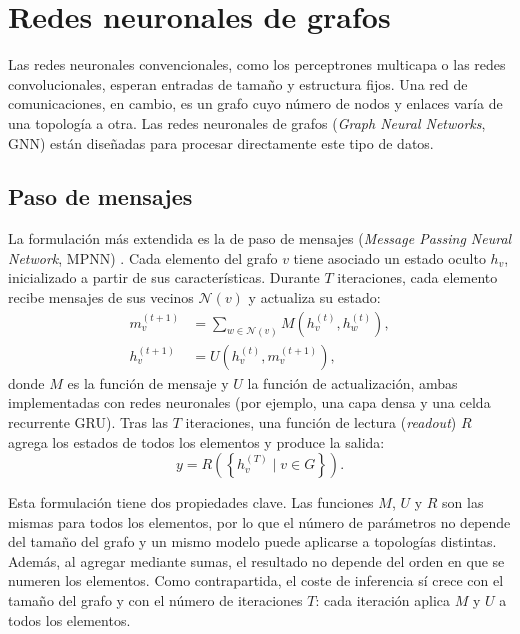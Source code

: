 \section{Redes neuronales de grafos}\label{sec:gnn}

Las redes neuronales convencionales, como los perceptrones multicapa o las redes convolucionales, esperan entradas de tamaño y estructura fijos. Una red de comunicaciones, en cambio, es un grafo cuyo número de nodos y enlaces varía de una topología a otra. Las redes neuronales de grafos (\textit{Graph Neural Networks}, GNN) \cite{scarselli2009graph} están diseñadas para procesar directamente este tipo de datos.

\subsection{Paso de mensajes}\label{sec:mpnn}

La formulación más extendida es la de paso de mensajes (\textit{Message Passing Neural Network}, MPNN) \cite{gilmer2017neural}. Cada elemento del grafo $v$ tiene asociado un estado oculto $h_v$, inicializado a partir de sus características. Durante $T$ iteraciones, cada elemento recibe mensajes de sus vecinos $\mathcal{N}(v)$ y actualiza su estado:
\begin{align}
	m_v^{(t+1)} &= \sum_{w \in \mathcal{N}(v)} M\left(h_v^{(t)}, h_w^{(t)}\right), \label{eq:mp_msg}\\
	h_v^{(t+1)} &= U\left(h_v^{(t)}, m_v^{(t+1)}\right), \label{eq:mp_upd}
\end{align}
donde $M$ es la función de mensaje y $U$ la función de actualización, ambas implementadas con redes neuronales (por ejemplo, una capa densa y una celda recurrente GRU). Tras las $T$ iteraciones, una función de lectura (\textit{readout}) $R$ agrega los estados de todos los elementos y produce la salida:
\begin{equation}\label{eq:readout}
	y = R\left(\left\{ h_v^{(T)} \mid v \in G \right\}\right).
\end{equation}

Esta formulación tiene dos propiedades clave. Las funciones $M$, $U$ y $R$ son las mismas para todos los elementos, por lo que el número de parámetros no depende del tamaño del grafo y un mismo modelo puede aplicarse a topologías distintas. Además, al agregar mediante sumas, el resultado no depende del orden en que se numeren los elementos. Como contrapartida, el coste de inferencia sí crece con el tamaño del grafo y con el número de iteraciones $T$: cada iteración aplica $M$ y $U$ a todos los elementos.

